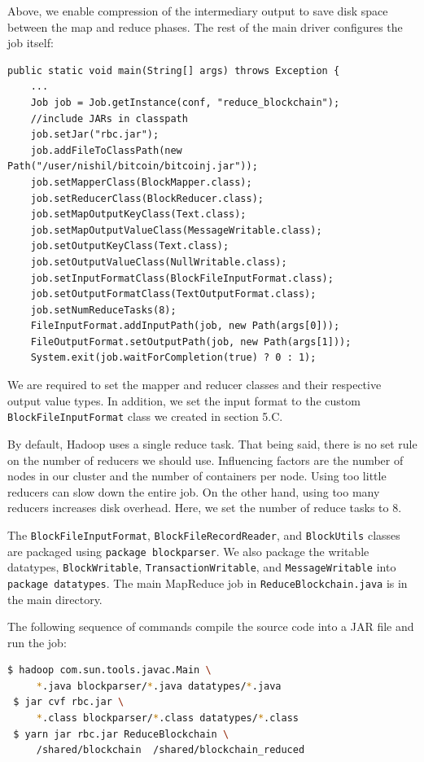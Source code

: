 \documentclass[9pt,twocolumn,twoside]{idsi}
\begin{document}
Above, we enable compression of the intermediary output to save disk space between the map and reduce phases. The rest of the main driver configures the job itself:

\begin{lstlisting}
public static void main(String[] args) throws Exception {
    ...
    Job job = Job.getInstance(conf, "reduce_blockchain");
    //include JARs in classpath
    job.setJar("rbc.jar");
    job.addFileToClassPath(new Path("/user/nishil/bitcoin/bitcoinj.jar"));
    job.setMapperClass(BlockMapper.class);
    job.setReducerClass(BlockReducer.class);
    job.setMapOutputKeyClass(Text.class);
    job.setMapOutputValueClass(MessageWritable.class);
    job.setOutputKeyClass(Text.class);
    job.setOutputValueClass(NullWritable.class);
    job.setInputFormatClass(BlockFileInputFormat.class);
    job.setOutputFormatClass(TextOutputFormat.class);
    job.setNumReduceTasks(8);
    FileInputFormat.addInputPath(job, new Path(args[0]));
    FileOutputFormat.setOutputPath(job, new Path(args[1]));
    System.exit(job.waitForCompletion(true) ? 0 : 1);
\end{lstlisting}

We are required to set the mapper and reducer classes and their respective output value types. In addition, we set the input format to the custom \lstinline{BlockFileInputFormat} class we created in section 5.C.

By default, Hadoop uses a single reduce task. That being said, there is no set rule on the number of reducers we should use. Influencing factors are the number of nodes in our cluster and the number of containers per node. Using too little reducers can slow down the entire job. On the other hand, using too many reducers increases disk overhead. Here, we set the number of reduce tasks to 8.

The \lstinline{BlockFileInputFormat}, \lstinline{BlockFileRecordReader}, and \lstinline{BlockUtils} classes are packaged using \lstinline{package blockparser}. We also package the writable datatypes, \lstinline{BlockWritable}, \lstinline{TransactionWritable}, and \lstinline{MessageWritable} into \lstinline{package datatypes}. The main MapReduce job in \lstinline{ReduceBlockchain.java} is in the main directory.

The following sequence of commands compile the source code into a JAR file and run the job:

\begin{lstlisting}[language=bash]
 $ hadoop com.sun.tools.javac.Main \
     *.java blockparser/*.java datatypes/*.java
 $ jar cvf rbc.jar \
     *.class blockparser/*.class datatypes/*.class
 $ yarn jar rbc.jar ReduceBlockchain \
     /shared/blockchain  /shared/blockchain_reduced
\end{lstlisting}
\end{document}
